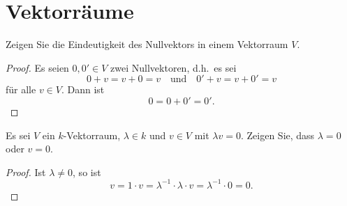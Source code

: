 \section{Vektorräume}


\begin{question}
 Zeigen Sie die Eindeutigkeit des Nullvektors in einem Vektorraum $V$.
\end{question}
\begin{proof}
 Es seien $0, 0' \in V$ zwei Nullvektoren, d.h.\ es sei
 \[
  0 + v = v + 0 = v \quad \text{und} \quad 0' + v = v + 0' = v
 \]
 für alle $v \in V$. Dann ist
 \[
  0 = 0 + 0' = 0'.
 \]
\end{proof}


\begin{question}
 Es sei $V$ ein $k$-Vektorraum, $\lambda \in k$ und $v \in V$ mit $\lambda v = 0$. Zeigen Sie, dass $\lambda = 0$ oder $v = 0$.
\end{question}
\begin{proof}
 Ist $\lambda \neq 0$, so ist
 \[
  v = 1 \cdot v = \lambda^{-1} \cdot \lambda \cdot v = \lambda^{-1} \cdot 0 = 0.
 \]
\end{proof}




